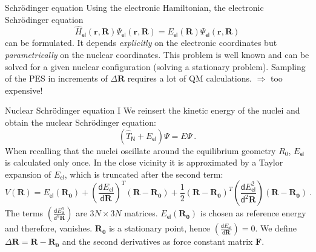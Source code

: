 \documentclass[t]{beamer}
\begin{document}
\begin{frame}{Schrödinger equation}
	Using the electronic Hamiltonian, the electronic Schrödinger equation
	\begin{equation*}
		\hat{H}_\mathsf{el}(\mathbf{r,R}) \Psi_\mathsf{el}(\mathbf{r,R}) = E_\mathsf{el}(\mathbf{R}) \Psi_\mathsf{el}(\mathbf{r,R})
	\end{equation*}
	can be formulated. It depends \textit{explicitly} on the electronic coordinates but \textit{parametrically} on the nuclear coordinates.
	\newline
	\newline
	This problem is well known and can be solved for a given nuclear configuration (solving a stationary problem). Sampling of the PES in increments of $\Delta \mathbf{R}$ requires a lot of QM calculations.
	\newline
	\newline
	$\Longrightarrow$ too expensive!
\end{frame}
\begin{frame}{Nuclear Schrödinger equation I}
	We reinsert the kinetic energy of the nuclei and obtain the nuclear Schrödinger equation:
	\begin{equation*}
		(\hat{T}_\mathsf{N} + E_\mathsf{el}) \Psi = E\Psi~.
	\end{equation*}
	When recalling that the nuclei oscillate around the equilibrium geometry $R_0$, $E_\mathsf{el}$ is calculated only once. In the close vicinity it is approximated by a Taylor expansion of $E_\mathsf{el}$, which is truncated after the second term:
	\begin{equation*}
		V(\mathbf{R}) = E_\mathsf{el}(\mathbf{R_0}) + \left( \frac{\mathsf{d} E_\mathsf{el}}{\mathsf{d} \mathbf{R}}\right)^T (\mathbf{R - R_0}) + \frac{1}{2}(\mathbf{R - R_0})^T \left( \frac{\mathsf{d} E_\mathsf{el}^2}{\mathsf{d}^2 \mathbf{R}}\right) (\mathbf{R - R_0})~.
	\end{equation*}
	The terms $\left( \frac{\mathsf{d} E_\mathsf{el}^n}{\mathsf{d}^n \mathbf{R}}\right)$ are $3N \times 3N$ matrices. $E_\mathsf{el}(\mathbf{R_0})$ is chosen as reference energy and therefore, vanishes. $\mathbf{R_0}$ is a stationary point, hence $\left( \frac{\mathsf{d} E_\mathsf{el}}{\mathsf{d} \mathbf{R}}\right) = 0$. We define $\Delta \mathbf{R = R - R_0}$ and the second derivatives as force constant matrix $\mathbf{F}$.
\end{frame}
\end{document}

